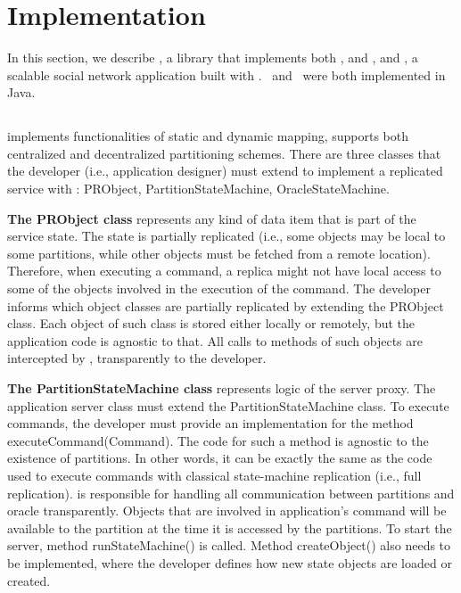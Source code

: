 \section{Implementation}
\label{sec:implementation}

In this section, we describe \libname{}, a library that implements both \ssmr{}, \dssmr{} and \dynastar{}, and \appname{}, a scalable social network application built with \libname{}. \libname\ and \appname\ were both implemented in Java.

\subsection{\libname}

\libname{} implements functionalities of static and dynamic mapping, supports both centralized and decentralized partitioning schemes. There 
are three classes that the developer (i.e., application designer) must extend to implement a replicated service with \libname{}: PRObject, 
PartitionStateMachine, OracleStateMachine.

\textbf{The PRObject class} represents any kind of data item that is part of the service state. The state is partially replicated (i.e., some 
objects may be local to some partitions, while other objects must be fetched from a remote location). Therefore, when executing a command, a 
replica might not have local access to some of the objects involved in the execution of the command. The developer informs \libname{} which 
object classes are partially replicated by extending the PRObject class. Each object of such class is stored either locally or remotely, but 
the application code is agnostic to that. All calls to methods of such objects are intercepted by \libname{}, transparently to the developer. 

\textbf{The PartitionStateMachine class} represents logic of the server proxy. The application server class must extend the 
PartitionStateMachine class. To execute commands, the developer must provide an implementation for the method executeCommand(Command). The code 
for such a method is agnostic to the existence of partitions. In other words, it can be exactly the same as the code used to execute commands 
with classical state-machine replication (i.e., full replication). \libname{} is responsible for handling all communication between partitions 
and oracle transparently. Objects that are involved in application's command will be available to the partition at the time it is accessed by the partitions. To start the server, method runStateMachine() is called. Method createObject() also needs to be implemented, where the 
developer defines how new state objects are loaded or created.


